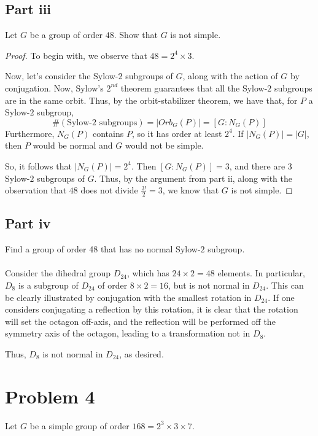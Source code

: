 \documentclass[12pt,reqno]{amsart}
\begin{document}
\subsection*{Part iii}
Let $G$ be a group of order $48$. Show that $G$ is not simple.
\\
\begin{proof}
    To begin with, we observe that $48 = 2^4\times3$.

    Now, let's consider the Sylow-$2$ subgroups of $G$, along with the action
    of $G$ by conjugation. Now, Sylow's $2^{nd}$ theorem guarantees that all
    the Sylow-$2$ subgroups are in the same orbit. Thus, by the orbit-stabilizer
    theorem, we have that, for $P$ a Sylow-$2$ subgroup,
    \[
        \#(\textrm{Sylow-$2$ subgroups}) = |Orb_G(P)|=[G:N_G(P)]
    \]
    Furthermore, $N_G(P)$ contains $P$, so it has order at least $2^4$.
    If $|N_G(P)| = |G|$, then $P$ would be normal and $G$ would not be simple.

    So, it follows that $|N_G(P)| = 2^4$. Then $[G:N_G(P)] = 3$, and there are $3$ Sylow-$2$
    subgroups of $G$. Thus, by the argument from part ii, along with the
    observation that $48$ does not divide $\frac{3!}{2} = 3$, we know that $G$
    is not simple.
\end{proof}

\subsection*{Part iv}
Find a group of order 48 that has no normal Sylow-$2$ subgroup.
\\
\\
Consider the dihedral group $D_{24}$, which has $24\times 2=48$ elements. In
particular, $D_8$ is a subgroup of $D_{24}$ of order $8\times 2=16$, but is not
normal in $D_{24}$. This can be clearly illustrated by conjugation with the
smallest rotation in $D_{24}$. If one considers conjugating a reflection by this
rotation, it is clear that the rotation will set the octagon off-axis, and the
reflection will be performed off the symmetry axis of the octagon, leading to a
transformation not in $D_8$.

Thus, $D_8$ is not normal in $D_{24}$, as desired.

\newpage

\section*{Problem 4}
Let $G$ be a simple group of order $168=2^3\times3\times7$.
\end{document}
